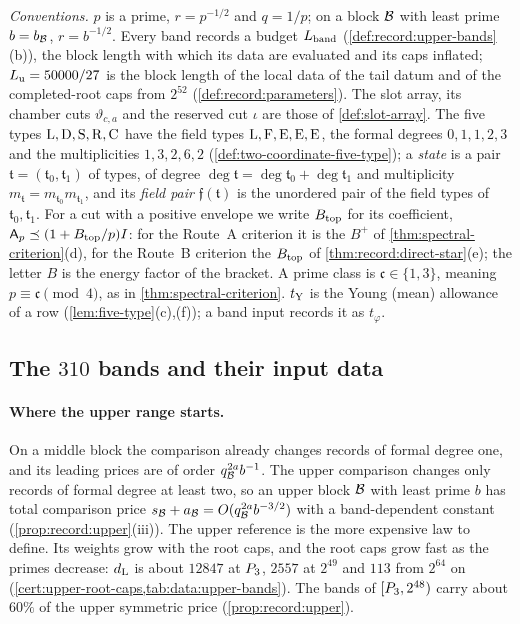\emph{Conventions.} $p$ is a prime, $r=p^{-1/2}$ and $q=1/p$; on a block $\mathcal B$
with least prime $b=b_\mathcal B$, $r=b^{-1/2}$. Every band records a budget
$L_{\rm band}$ (\cref{def:record:upper-bands}(b)), the block length with which
its data are evaluated and its caps inflated; $L_{\rm u}=50000/27$ is the block
length of the local data of the tail datum and of the completed-root caps from
$2^{52}$ (\cref{def:record:parameters}). The slot array, its chamber cuts
$\vartheta_{c,a}$ and the reserved cut $\iota$ are those of \cref{def:slot-array}.
The five types $\rm L,D,S,R,C$ have the field types ${\rm L,F,E,E,E}$, the formal
degrees $0,1,1,2,3$ and the multiplicities $1,3,2,6,2$
(\cref{def:two-coordinate-five-type}); a \emph{state} is a pair
$\mathfrak t=(\mathfrak t_0,\mathfrak t_1)$ of types, of degree
$\deg\mathfrak t=\deg\mathfrak t_0+\deg\mathfrak t_1$ and multiplicity
$m_{\mathfrak t}=m_{\mathfrak t_0}m_{\mathfrak t_1}$, and its \emph{field pair}
$\mathfrak f(\mathfrak t)$ is the unordered pair of the field types of
$\mathfrak t_0,\mathfrak t_1$. For a cut with a positive envelope we write
$B_{\rm top}$ for its coefficient, $\mathsf A_p\preceq(1+B_{\rm top}/p)I$: for the
Route~A criterion it is the $B^+$ of \cref{thm:spectral-criterion}(d), for
the Route~B criterion the $B_{\rm top}$ of
\cref{thm:record:direct-star}(e); the letter $B$ is the energy factor of the
bracket. A prime class is $\mathfrak c\in\{1,3\}$, meaning $p\equiv\mathfrak c\pmod4$,
as in \cref{thm:spectral-criterion}. $t_{\rm Y}$ is the Young (mean) allowance of a
row (\cref{lem:five-type}(c),(f)); a band input records it as $t_\varphi$.

\subsection{The \texorpdfstring{$310$}{310} bands and their input data}\label{subsec:upper-bands}

\paragraph{Where the upper range starts.}
On a middle block the comparison already changes records of formal degree one,
and its leading prices are of order $q_\mathcal B^{2a}b^{-1}$. The upper comparison changes only records
of formal degree at least two, so an upper block $\mathcal B$ with
least prime $b$ has total comparison price
$s_\mathcal B+a_\mathcal B=O(q_\mathcal B^{2a}b^{-3/2})$ with a band-dependent
constant (\cref{prop:record:upper}(iii)). The upper reference is
the more expensive law to define.
Its weights grow with the root caps, and the root caps grow fast as the primes
decrease: $d_{\rm L}$ is about $12847$ at $P_3$, $2557$ at $2^{49}$ and $113$
from $2^{64}$ on (\cref{cert:upper-root-caps,tab:data:upper-bands}). The bands of
$[P_3,2^{48})$ carry about $60\%$ of the upper symmetric price
(\cref{prop:record:upper}).

